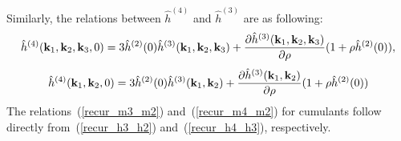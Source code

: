 Similarly, the relations between $\hat{h}^{(4)}$ and $\hat{h}^{(3)}$ are as following:
\begin{equation}
	\hat{h}^{(4)}(\vb k_1, \vb k_2, \vb k_3, 0) = 3\hat{h}^{(2)}(0)\hat{h}^{(3)}(\vb k_1, \vb k_2, \vb k_3) + \frac{\partial \hat{h}^{(3)}(\vb k_1, \vb k_2, \vb k_3)} {\partial \rho} (1 + \rho\hat{h}^{(2)}(0)),
\end{equation}
\begin{equation}
	\label{recur_h4_h3}
	\hat{h}^{(4)}(\vb k_1, \vb k_2, 0) = 3\hat{h}^{(2)}(0)\hat{h}^{(3)}(\vb k_1, \vb k_2) + \frac{\partial \hat{h}^{(3)}(\vb k_1, \vb k_2)} {\partial \rho} (1 + \rho\hat{h}^{(2)}(0))
\end{equation}
The relations~(\ref{recur_m3_m2}) and~(\ref{recur_m4_m2}) for cumulants follow directly from~(\ref{recur_h3_h2}) and~(\ref{recur_h4_h3}), respectively.

